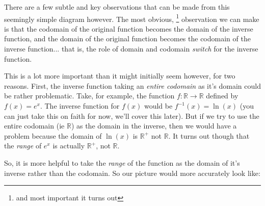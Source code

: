 \documentclass{ximeraXloud}
\begin{document}
There are a few subtle and key observations that can be made from this seemingly simple diagram however. The most obvious,%
\footnote{%
    and most important it turns out%
    }
observation we can make is that the codomain of the original function becomes the domain of the inverse function, and the domain of the original function becomes the codomain of the inverse function... that is, the role of domain and codomain \textit{switch} for the inverse function.

This is a lot more important than it might initially seem however, for two reasons. First, the inverse function taking an \textit{entire codomain} as it's domain could be rather problematic. Take, for example, the function $f:\mathbb{R}\rightarrow\mathbb{R}$ defined by $f(x) = e^x$. The inverse function for $f(x)$ would be $f^{-1}(x) = \ln(x)$ (you can just take this on faith for now, we'll cover this later). But if we try to use the entire codomain (ie $\mathbb{R}$) as the domain in the inverse, then we would have a problem because the domain of $\ln(x)$ is $\mathbb{R}^+$ not $\mathbb{R}$. It turns out though that the \textit{range} of $e^x$ is actually $\mathbb{R}^+$, not $\mathbb{R}$. 

So, it is more helpful to take the \textit{range} of the function as the domain of it's inverse rather than the codomain. So our picture would more accurately look like:

\begin{center}
\end{center}
\end{document}
